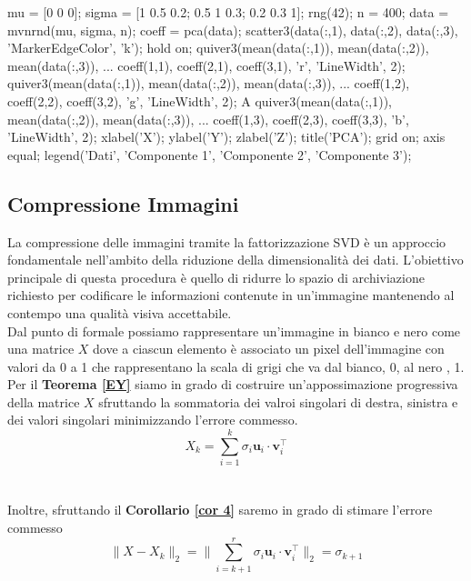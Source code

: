 \documentclass[11pt]{article}
\begin{document}
\begin{matlabcode}
mu = [0 0 0]; %
sigma = [1 0.5 0.2; 0.5 1 0.3; 0.2 0.3 1]; %
rng(42); %
n = 400; %
data = mvnrnd(mu, sigma, n); %
coeff = pca(data); %
scatter3(data(:,1), data(:,2), data(:,3), 'MarkerEdgeColor', 'k'); 
hold on;
quiver3(mean(data(:,1)), mean(data(:,2)), mean(data(:,3)), ...
        coeff(1,1), coeff(2,1), coeff(3,1), 'r', 'LineWidth', 2); 
quiver3(mean(data(:,1)), mean(data(:,2)), mean(data(:,3)), ...
        coeff(1,2), coeff(2,2), coeff(3,2), 'g', 'LineWidth', 2); A
quiver3(mean(data(:,1)), mean(data(:,2)), mean(data(:,3)), ...
        coeff(1,3), coeff(2,3), coeff(3,3), 'b', 'LineWidth', 2); 
xlabel('X'); ylabel('Y'); zlabel('Z');
title('PCA');
grid on; axis equal;
legend({'Dati', 'Componente 1', 'Componente 2', 'Componente 3'});
\end{matlabcode}

\subsection{Compressione Immagini}
La compressione delle immagini tramite la fattorizzazione SVD è un approccio fondamentale nell'ambito della riduzione della dimensionalità dei dati. L'obiettivo principale di questa procedura è quello di ridurre lo spazio di archiviazione richiesto per codificare le informazioni contenute in un'immagine mantenendo al contempo una qualità visiva accettabile.\\
Dal punto di formale possiamo rappresentare un'immagine in bianco e nero come una matrice $X$ dove a ciascun elemento è associato un pixel dell'immagine con valori da 0 a 1 che rappresentano la scala di grigi che va dal bianco, 0, al nero , 1. \\
Per il \textbf{Teorema \ref{EY}} siamo in grado di costruire un'appossimazione progressiva della matrice $X$ sfruttando la sommatoria dei valroi singolari di destra, sinistra e dei valori singolari minimizzando l'errore commesso. 
$$ X_k= \sum_{i=1}^{k} \sigma_i \mathbf{u}_i \cdot \mathbf{v}_i^\top $$\\
\\
Inoltre, sfruttando il \textbf{Corollario \ref{cor 4}} saremo in grado di stimare l'errore commesso
$$\|X-X_k\|_2 = \| \sum_{i=k+1}^{r} \sigma_i \mathbf{u}_i \cdot \mathbf{v}_i^\top\|_2=\sigma_{k+1} $$ 
\end{document}
